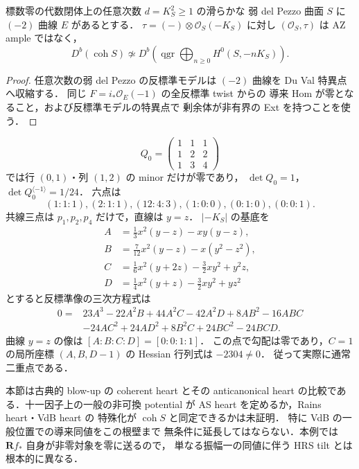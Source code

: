 \begin{corollary}
\label{cor:all-degree-weak-dp}
標数零の代数閉体上の任意次数 $d=K_S^2\ge1$ の滑らかな
弱 del Pezzo 曲面 $S$ に $(-2)$ 曲線 $E$ があるとする．
$\tau=(-)\otimes\mathcal O_S(-K_S)$ に対し
$(\mathcal O_S,\tau)$ は AZ ample ではなく，
\[
D^b(\operatorname{coh}S)\not\simeq
D^b\!\left(\operatorname{qgr}
 \bigoplus_{n\ge0}H^0(S,-nK_S)\right).
\]
\end{corollary}
\begin{proof}
任意次数の弱 del Pezzo の反標準モデルは $(-2)$ 曲線を
Du Val 特異点へ収縮する\cite[Theorem 8.3.2]{Dolgachev}．
同じ $F=i_*\mathcal O_E(-1)$ の全反標準 twist からの
導来 Hom が零となること，および反標準モデルの特異点で
剰余体が非有界の Ext を持つことを使う．
\end{proof}

\begin{proposition}[一つの根壁の有理数上の明示例]
\label{prop:explicit-single-root-wall}
\[
Q_0=\begin{pmatrix}1&1&1\\1&2&2\\1&3&4\end{pmatrix}
\]
では行 $(0,1)$・列 $(1,2)$ の minor だけが零であり，
$\det Q_0=1$，$\det Q_0^{\langle-1\rangle}=1/24$．
六点は
\[
(1:1:1),(2:1:1),(12:4:3),(1:0:0),(0:1:0),(0:0:1).
\]
共線三点は $p_1,p_2,p_4$ だけで，直線は $y=z$．
$|-K_S|$ の基底を
\[
\begin{aligned}
 A&=\tfrac13x^2(y-z)-xy(y-z),\\
 B&=\tfrac7{12}x^2(y-z)-x(y^2-z^2),\\
 C&=\tfrac16x^2(y+2z)-\tfrac32xy^2+y^2z,\\
 D&=\tfrac14x^2(y+z)-\tfrac32xy^2+yz^2
\end{aligned}
\]
とすると反標準像の三次方程式は
\[
\begin{aligned}
0={}&23A^3-22A^2B+44A^2C-42A^2D+8AB^2-16ABC\\
&-24AC^2+24AD^2+8B^2C+24BC^2-24BCD .
\end{aligned}
\]
曲線 $y=z$ の像は $[A:B:C:D]=[0:0:1:1]$．
この点で勾配は零であり，$C=1$ の局所座標
$(A,B,D-1)$ の Hessian 行列式は $-2304\ne0$．
従って実際に通常二重点である．
\end{proposition}

\begin{remark}[非可換への適用範囲]\label{rem:noncommutative-wall-scope}
本節は古典的 blow-up の coherent heart とその
anticanonical heart の比較である．十一因子上の一般の非可換
potential が AS heart を定めるか，Rains heart・VdB heart の
特殊化が $\operatorname{coh}S$ と同定できるかは未証明．
特に VdB の一般位置での導来同値をこの根壁まで
無条件に延長してはならない．本例では
$\mathbf Rf_*$ 自身が非零対象を零に送るので，
単なる振幅一の同値に伴う HRS tilt とは根本的に異なる．
\end{remark}
